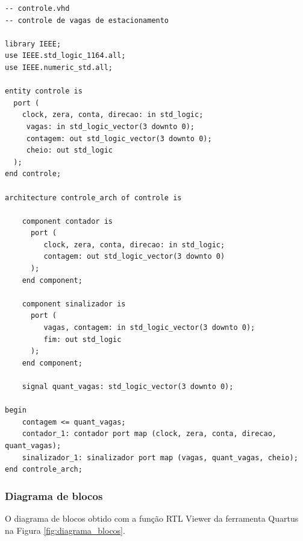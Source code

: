 \documentclass[a4,12pt]{horizon-theme}
\newenvironment{code}{\captionsetup{type=listing}}{}
\begin{document}
\begin{code}
  \label{lst:controle}
  \begin{verbatim}
-- controle.vhd
-- controle de vagas de estacionamento

library IEEE;
use IEEE.std_logic_1164.all;
use IEEE.numeric_std.all;

entity controle is
  port (
    clock, zera, conta, direcao: in std_logic;
	 vagas: in std_logic_vector(3 downto 0);
	 contagem: out std_logic_vector(3 downto 0);
	 cheio: out std_logic
  );
end controle;

architecture controle_arch of controle is

	component contador is
	  port (
		 clock, zera, conta, direcao: in std_logic;
		 contagem: out std_logic_vector(3 downto 0)
	  );
	end component;
	
	component sinalizador is
	  port (
		 vagas, contagem: in std_logic_vector(3 downto 0);
		 fim: out std_logic
	  );
	end component;
	
	signal quant_vagas: std_logic_vector(3 downto 0);

begin
	contagem <= quant_vagas;
	contador_1: contador port map (clock, zera, conta, direcao, quant_vagas);
	sinalizador_1: sinalizador port map (vagas, quant_vagas, cheio);
end controle_arch;
\end{verbatim}
\end{code}

\newpage
\subsubsection{Diagrama de blocos}

O diagrama de blocos obtido com a função RTL Viewer da ferramenta Quartus na Figura \ref{fig:diagrama_blocos}.
\end{document}
